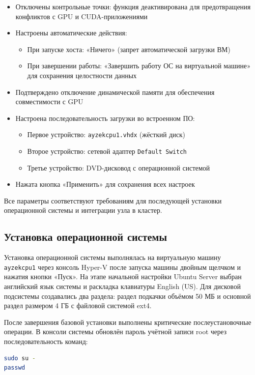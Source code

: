 \documentclass[areaset=advanced]{scrartcl}
\begin{document}
\begin{itemize}
    \item Отключены контрольные точки: функция деактивирована для предотвращения конфликтов с GPU и CUDA-приложениями
    \item Настроены автоматические действия:
    \begin{itemize}
        \item При запуске хоста: «Ничего» (запрет автоматической загрузки ВМ)
        \item При завершении работы: «Завершить работу ОС на виртуальной машине» для сохранения целостности данных
    \end{itemize}
    \item Подтверждено отключение динамической памяти для обеспечения совместимости с GPU
    \item Настроена последовательность загрузки во встроенном ПО:
    \begin{itemize}
        \item Первое устройство: \texttt{ayzekcpu1.vhdx} (жёсткий диск)
        \item Второе устройство: сетевой адаптер \texttt{Default Switch}
        \item Третье устройство: DVD-дисковод с операционной системой
    \end{itemize}
    \item Нажата кнопка «Применить» для сохранения всех настроек
\end{itemize}

Все параметры соответствуют требованиям для последующей установки операционной системы и интеграции узла в кластер.

\subsection{Установка операционной системы}
Установка операционной системы выполнялась на виртуальную машину \texttt{ayzekcpu1} через консоль Hyper-V после запуска машины двойным щелчком и нажатия кнопки «Пуск». На этапе начальной настройки Ubuntu Server выбран английский язык системы и раскладка клавиатуры English (US). Для дисковой подсистемы создавались два раздела: раздел подкачки объёмом 50 МБ и основной раздел размером 4 ГБ с файловой системой ext4.

После завершения базовой установки выполнены критические послеустановочные операции. В консоли системы обновлён пароль учётной записи root через последовательность команд:

\begin{lstlisting}[language=bash]
sudo su -
passwd
\end{lstlisting}
\end{document}
